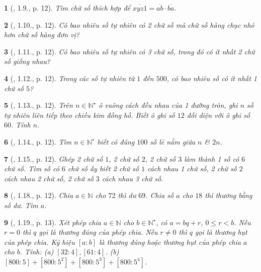 \documentclass{article}
\newtheorem{baitoan}{}
\begin{document}
\begin{baitoan}[\cite{TLCT_THCS_Toan_6_so_hoc}, 1.9., p. 12]
	Tìm chữ số thích hợp để $\overline{xyz1} = \overline{ab}\cdot\overline{ba}$.
\end{baitoan}

\begin{baitoan}[\cite{TLCT_THCS_Toan_6_so_hoc}, 1.10., p. 12]
	Có bao nhiêu số tự nhiên có 2 chữ số mà chữ số hàng chục nhỏ hơn chữ số hàng đơn vị?
\end{baitoan}

\begin{baitoan}[\cite{TLCT_THCS_Toan_6_so_hoc}, 1.11., p. 12]
	Có bao nhiêu số tự nhiên có 3 chữ số, trong đó có ít nhất 2 chữ số giống nhau?
\end{baitoan}

\begin{baitoan}[\cite{TLCT_THCS_Toan_6_so_hoc}, 1.12., p. 12]
	Trong các số tự nhiên từ $1$ đến $500$, có bao nhiêu số có ít nhất 1 chữ số $5$?
\end{baitoan}

\begin{baitoan}[\cite{TLCT_THCS_Toan_6_so_hoc}, 1.13., p. 12]
	Trên $n\in\mathbb{N}^\star$ ô vuông cách đều nhau của 1 đường tròn, ghi $n$ số tự nhiên liên tiếp theo chiều kim đồng hồ. Biết ô ghi số $12$ đối diện với ô ghi số $60$. Tính $n$.
\end{baitoan}

\begin{baitoan}[\cite{TLCT_THCS_Toan_6_so_hoc}, 1.14., p. 12]
	Tìm $n\in\mathbb{N}^\star$ biết có đúng $100$ số lẻ nằm giữa $n$ \& $2n$.
\end{baitoan}

\begin{baitoan}[\cite{TLCT_THCS_Toan_6_so_hoc}, 1.15., p. 12]
	Ghép 2 chữ số $1$, 2 chữ số $2$, 2 chữ số $3$ làm thành 1 số có $6$ chữ số. Tìm số có $6$ chữ số ấy biết 2 chữ số $1$ cách nhau 1 chữ số, 2 chữ số $2$ cách nhau 2 chữ số, 2 chữ số $3$ cách nhau 3 chữ số.
\end{baitoan}

\begin{baitoan}[\cite{TLCT_THCS_Toan_6_so_hoc}, 1.18., p. 12]
	Chia $a\in\mathbb{N}$ cho $72$ thì dư $69$. Chia số $a$ cho $18$ thì thương bằng số dư. Tìm $a$.
\end{baitoan}

\begin{baitoan}[\cite{TLCT_THCS_Toan_6_so_hoc}, 1.19., p. 13]
	Xét phép chia $a\in\mathbb{N}$ cho $b\in\mathbb{N}^\star$, có $a = bq + r$, $0\le r < b$. Nếu $r = 0$ thì $q$ gọi là {\rm thương đúng} của phép chia. Nếu $r\ne0$ thì $q$ gọi là {\rm thương hụt} của phép chia. Ký hiệu $[a:b]$ là thương đúng hoặc thương hụt của phép chia $a$ cho $b$. Tính: (a) $[32:4],[61:4]$. (b) $[800:5] + [800:5^2] + [800:5^3] + [800:5^4]$.
\end{baitoan}
\end{document}
